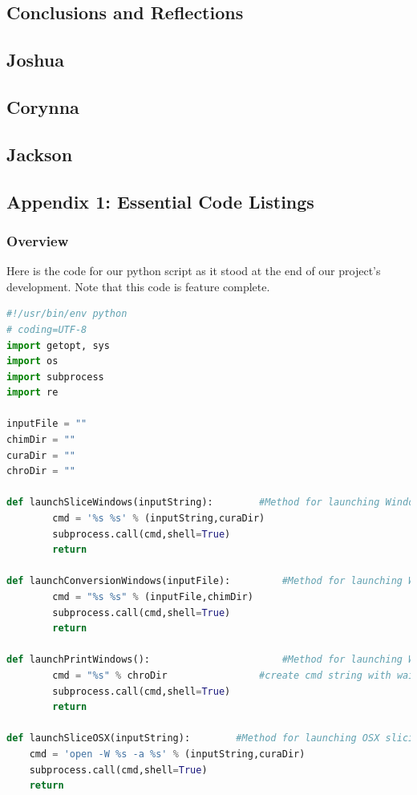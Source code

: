\documentclass[letterpaper, onecolumn, draftclsnofoot, 10pt, compsoc]{IEEEtran}
\begin{document}
\begin{singlespace}
\section{Conclusions and Reflections}
\subsection{Joshua}

\subsection{Corynna}

\subsection{Jackson}


\subsection{Appendix 1: Essential Code Listings}
\subsubsection{Overview}
Here is the code for our python script as it stood at the end of our project's development. Note that this code is feature complete.

\begin{lstlisting}[language=Python]
#!/usr/bin/env python
# coding=UTF-8
import getopt, sys
import os
import subprocess
import re

inputFile = ""
chimDir = ""
curaDir = ""
chroDir = ""

def launchSliceWindows(inputString):       	#Method for launching Windows slicing software
        cmd = '%s %s' % (inputString,curaDir)
        subprocess.call(cmd,shell=True)
        return

def launchConversionWindows(inputFile):       	#Method for launching Windows conversion software
        cmd = "%s %s" % (inputFile,chimDir)
        subprocess.call(cmd,shell=True)
        return

def launchPrintWindows():                   	#Method for launching Windows printing software
        cmd = "%s" % chroDir         		#create cmd string with wait flag to hold execution
        subprocess.call(cmd,shell=True)
        return

def launchSliceOSX(inputString):		#Method for launching OSX slicing software
	cmd = 'open -W %s -a %s' % (inputString,curaDir)
	subprocess.call(cmd,shell=True)
	return


\end{lstlisting}
\end{singlespace}
\end{document}
